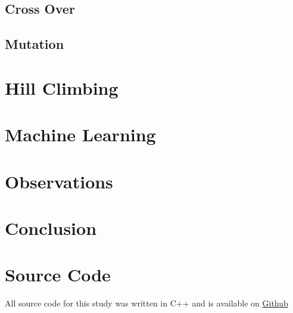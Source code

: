 \documentclass[12pt]{article}
\begin{document}
\subsection{Cross Over}
\subsection{Mutation}



\pagebreak

\section{Hill Climbing}

\pagebreak

\section{Machine Learning}

\pagebreak

\section{Observations}
\label{observations}

\pagebreak

\section{Conclusion}

\pagebreak

\section{Source Code}
All source code for this study was written in C++ and is
available on
\href{https://github.com/Quinny/IteratedPrisoners}{Github}
\end{document}
